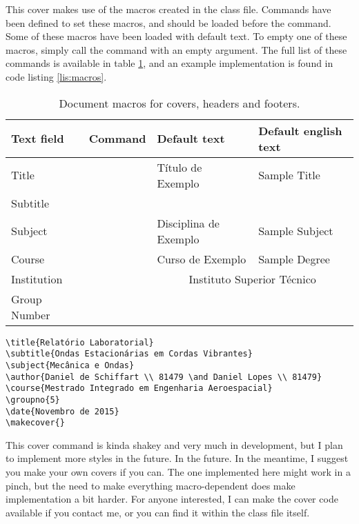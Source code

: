 \documentclass[palatino,english]{ist-report}
\begin{document}
This cover makes use of the macros created in the class file. Commands have been defined to set these macros, and should be loaded before the \texttt{\makecover{}} command. Some of these macros have been loaded with default text. To empty one of these macros, simply call the command with an empty argument. The full list of these commands is available in table \ref{tab:macros}, and an example implementation is found in code listing \ref{lis:macros}.
\begin{table}[ht]
	\centering
	\begin{tabular}{l l l l}\toprule
		Text field		& Command						& Default text			& Default english text	\\
		\midrule
		Title			& \texttt{\title}		& Título de Exemplo		& Sample Title			\\
		Subtitle		& \texttt{\subtitle}	& 						&						\\
		Subject			& \texttt{\subject}	& Disciplina de Exemplo	& Sample Subject		\\
		Course			& \texttt{\course}		& Curso de Exemplo		& Sample Degree			\\
		Institution		& \texttt{\institution}& \multicolumn{2}{c}{Instituto Superior Técnico}\\
		Group Number	& \texttt{\groupno}	& 						& 						\\
		\bottomrule
	\end{tabular}
	\caption{Document macros for covers, headers and footers.}
	\label{tab:macros}
\end{table}

\begin{listing}[ht]
	\begin{verbatim}
\title{Relatório Laboratorial}
\subtitle{Ondas Estacionárias em Cordas Vibrantes}
\subject{Mecânica e Ondas}
\author{Daniel de Schiffart \\ 81479 \and Daniel Lopes \\ 81479}
\course{Mestrado Integrado em Engenharia Aeroespacial}
\groupno{5}
\date{Novembro de 2015}
\makecover{}
	\end{verbatim}
	\caption{Example usage of \texttt{\makecover} and the macros in table \ref{tab:macros}.}
	\label{lis:macros}
\end{listing}

This cover command is kinda shakey and very much in development, but I plan to implement more styles in the future. In the future. In the meantime, I suggest you make your own covers if you can. The one implemented here might work in a pinch, but the need to make everything macro-dependent does make implementation a bit harder. For anyone interested, I can make the cover code available if you contact me, or you can find it within the class file itself.
\end{document}
